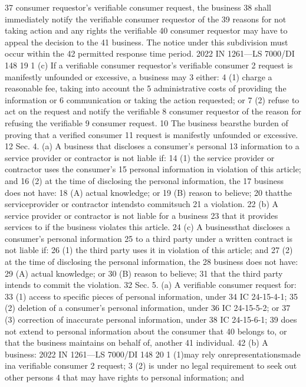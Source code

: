 37 consumer requestor's verifiable consumer request, the business
38 shall immediately notify the verifiable consumer requestor of the
39 reasons for not taking action and any rights the verifiable
40 consumer requestor may have to appeal the decision to the
41 business. The notice under this subdivision must occur within the
42 permitted response time period.
2022 IN 1261—LS 7000/DI 148
19
1 (c) If a verifiable consumer requestor's verifiable consumer
2 request is manifestly unfounded or excessive, a business may
3 either:
4 (1) charge a reasonable fee, taking into account the
5 administrative costs of providing the information or
6 communication or taking the action requested; or
7 (2) refuse to act on the request and notify the verifiable
8 consumer requestor of the reason for refusing the verifiable
9 consumer request.
10 The business bearsthe burden of proving that a verified consumer
11 request is manifestly unfounded or excessive.
12 Sec. 4. (a) A business that discloses a consumer's personal
13 information to a service provider or contractor is not liable if:
14 (1) the service provider or contractor uses the consumer's
15 personal information in violation of this article; and
16 (2) at the time of disclosing the personal information, the
17 business does not have:
18 (A) actual knowledge; or
19 (B) reason to believe;
20 thatthe serviceprovider or contractor intendsto commitsuch
21 a violation.
22 (b) A service provider or contractor is not liable for a business
23 that it provides services to if the business violates this article.
24 (c) A businessthat discloses a consumer's personal information
25 to a third party under a written contract is not liable if:
26 (1) the third party uses it in violation of this article; and
27 (2) at the time of disclosing the personal information, the
28 business does not have:
29 (A) actual knowledge; or
30 (B) reason to believe;
31 that the third party intends to commit the violation.
32 Sec. 5. (a) A verifiable consumer request for:
33 (1) access to specific pieces of personal information, under
34 IC 24-15-4-1;
35 (2) deletion of a consumer's personal information, under
36 IC 24-15-5-2; or
37 (3) correction of inaccurate personal information, under
38 IC 24-15-6-1;
39 does not extend to personal information about the consumer that
40 belongs to, or that the business maintains on behalf of, another
41 individual.
42 (b) A business:
2022 IN 1261—LS 7000/DI 148
20
1 (1)may rely onrepresentationsmade ina verifiable consumer
2 request;
3 (2) is under no legal requirement to seek out other persons
4 that may have rights to personal information; and
